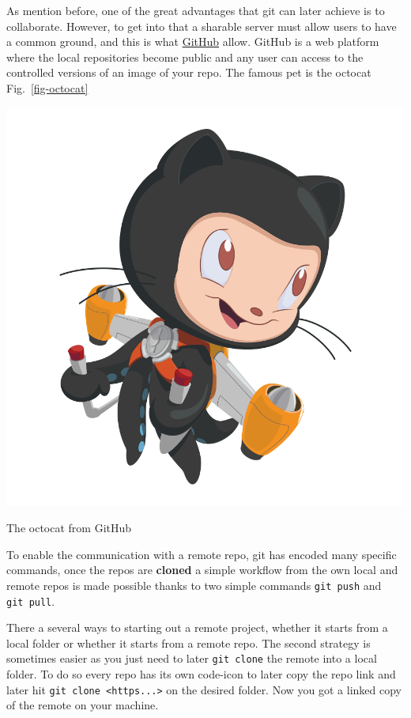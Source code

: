 \documentclass[
  letterpaper,
  DIV=11,
  numbers=noendperiod,
  oneside]{scrreprt}
\begin{document}
As mention before, one of the great advantages that git can later
achieve is to collaborate. However, to get into that a sharable server
must allow users to have a common ground, and this is what
\href{https://github.com/home}{GitHub} allow. GitHub is a web platform
where the local repositories become public and any user can access to
the controlled versions of an image of your repo. The famous pet is the
octocat Fig.~\ref{fig-octocat}

\begin{marginfigure}

{\centering \includegraphics{chs-command-line/imgs-cli/octocat.png}

}

\caption{\label{fig-octocat}The octocat from GitHub}

\end{marginfigure}

To enable the communication with a remote repo, git has encoded many
specific commands, once the repos are \textbf{cloned} a simple workflow
from the own local and remote repos is made possible thanks to two
simple commands \texttt{git\ push} and \texttt{git\ pull}.

There a several ways to starting out a remote project, whether it starts
from a local folder or whether it starts from a remote repo. The second
strategy is sometimes easier as you just need to later
\texttt{git\ clone} the remote into a local folder. To do so every repo
has its own code-icon  to later copy the repo link and
later hit \texttt{git\ clone\ \textless{}https...\textgreater{}} on the
desired folder. Now you got a linked copy of the remote on your machine.
\end{document}
